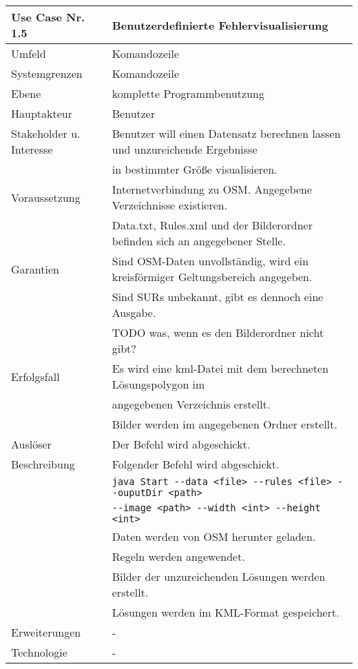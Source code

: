 \begin{tabular}{| l | l |}
 \hline
 \textbf{Use Case Nr. 1.5} & Benutzerdefinierte Fehlervisualisierung\\
 \hline
 Umfeld & Komandozeile\\
 \hline
 Systemgrenzen & Komandozeile\\
 \hline
 Ebene & komplette Programmbenutzung\\
 \hline
 Hauptakteur & Benutzer\\
 \hline
 Stakeholder u. Interesse & Benutzer will einen Datensatz berechnen lassen und unzureichende Ergebnisse\\
			  & in bestimmter Größe visualisieren.\\
 \hline
 Voraussetzung & Internetverbindung zu OSM. Angegebene Verzeichnisse existieren.\\
	      & Data.txt, Rules.xml und der Bilderordner befinden sich an angegebener Stelle. \\
 \hline
 Garantien & Sind OSM-Daten unvollständig, wird ein kreisförmiger Geltungsbereich angegeben.\\
	  & Sind SURs unbekannt, gibt es dennoch eine Ausgabe.\\
	  & TODO was, wenn es den Bilderordner nicht gibt?\\
 \hline
 Erfolgsfall & Es wird eine kml-Datei mit dem berechneten Lösungspolygon im\\
	    & angegebenen Verzeichnis erstellt.\\
	    & Bilder werden im angegebenen Ordner erstellt.\\
 \hline
 Auslöser & Der Befehl wird abgeschickt.\\
 \hline
 Beschreibung & Folgender Befehl wird abgeschickt.\\
	    & \verb|java Start --data <file> --rules <file> --ouputDir <path>|\\
	    & \hspace{24pt} \verb|--image <path> --width <int> --height <int>|\\
	    & Daten werden von OSM herunter geladen.\\
	    & Regeln werden angewendet.\\
	    & Bilder der unzureichenden Lösungen werden erstellt.\\
	    & Lösungen werden im KML-Format gespeichert.\\
 \hline
 Erweiterungen & -\\
 \hline
 Technologie & -\\
 \hline
\end{tabular}



